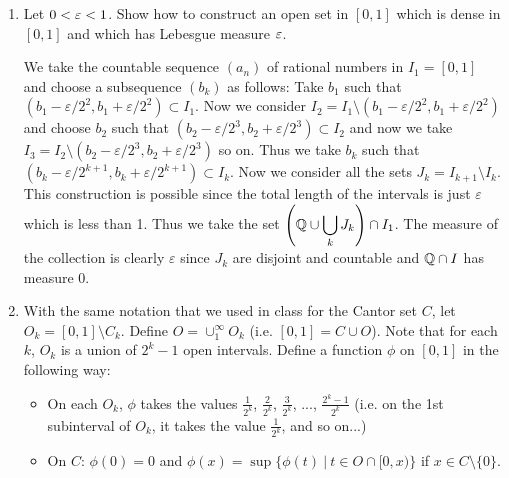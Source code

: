 \documentclass[12pt]{article}
\begin{document}
\begin{enumerate}
    \item Let $0 < \varepsilon < 1$. Show how to construct an open set in $[0,1]$ which is dense in $[0,1]$ and which has Lebesgue measure $\varepsilon$. 
    \begin{mybox}
        We take the countable sequence $(a_n)$ of rational
        numbers in $I_1=[0,1]$ and choose a subsequence $(b_k)$
        as follows: Take $b_1$ such that $(b_1-\varepsilon
        /2^2,b_1+\varepsilon/2^2)\subset I_1$. Now we
        consider $I_2=I_1\setminus(b_1-\varepsilon/2^2,
        b_1+\varepsilon/2^2)$ and choose $b_2$ such that
        $(b_2-\varepsilon
        /2^3,b_2+\varepsilon/2^3)\subset I_2$ and now we take
        $I_3=I_2\setminus(b_2-\varepsilon
        /2^3,b_2+\varepsilon/2^3)$ so on.
        Thus we take $b_k$ such that $(b_k-\varepsilon
        /2^{k+1},b_k+\varepsilon/2^{k+1})\subset I_k$.
        Now we consider all the sets $J_k=I_{k+1}\setminus
        I_k$. This construction is possible since the total
        length of the intervals is just $\varepsilon$ which
        is less than 1. Thus we take the set
        $\displaystyle\left(\mathbb{Q}\cup \bigcup_k{J_k}\right)
        \cap I_1$. The measure of the collection is clearly
        $\varepsilon$ since $J_k$ are disjoint and countable
        and $\mathbb{Q}\cap I$ has measure 0.

    \end{mybox}
    
    \item With the same notation that we used in class for the Cantor set $C$, let $O_k =[0,1] \setminus C_k$. Define $O = \cup_1^{\infty} O_k$ (i.e. $[0,1] = C \cup O$). Note that for each $k$, $O_k$ is a union of $2^k -1$ open intervals. Define a function $\phi$ on $[0, 1]$ in the following way:
    \begin{itemize}
    \item On each $O_k$, $\phi$ takes the values $\frac{1}{2^k}$, $\frac{2}{2^k}$, $\frac{3}{2^k}$, ..., $\frac{2^k-1}{2^k}$ (i.e. on the 1st subinterval of $O_k$, it takes the value $\frac{1}{2^k}$, and so on...)
    \item On $C$: $\phi(0) = 0$ and $\phi(x) = \sup\{\phi(t) \ | \ t \in O \cap [0, x)\}$ if $x \in C \setminus \{0\}$.
    \end{itemize}
    

\end{enumerate}
\end{document}

